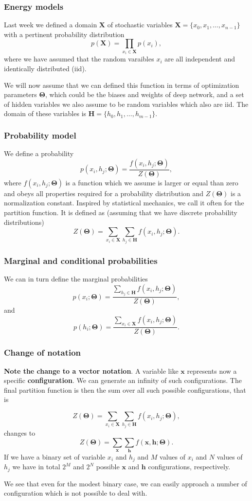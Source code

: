 \documentclass{beamer}
\begin{document}
\begin{frame}
\frametitle{Energy models}

Last week we defined a domain $\bm{X}$ of stochastic variables $\bm{X}= \{x_0,x_1, \dots , x_{n-1}\}$ with a pertinent probability distribution
\[
p(\bm{X})=\prod_{x_i\in \bm{X}}p(x_i),
\]
where we have assumed that the random varaibles $x_i$ are all independent and identically distributed (iid).

We will now assume that we can defined this function in terms of optimization parameters $\bm{\Theta}$, which could be the biases and weights of deep network, and a set of hidden variables we also assume to be random variables which also are iid. The domain of these variables is
$\bm{H}= \{h_0,h_1, \dots , h_{m-1}\}$.
\end{frame}

\begin{frame}
\frametitle{Probability model}

We define a probability
\[
p(x_i,h_j;\bm{\Theta}) = \frac{f(x_i,h_j;\bm{\Theta})}{Z(\bm{\Theta})},
\]
where $f(x_i,h_j;\bm{\Theta})$ is a function which we assume is larger or
equal than zero and obeys all properties required for a probability
distribution and $Z(\bm{\Theta})$ is a normalization constant. Inspired by
statistical mechanics, we call it often for the partition function.
It is defined as (assuming that we have discrete probability distributions)
\[
Z(\bm{\Theta})=\sum_{x_i\in \bm{X}}\sum_{h_j\in \bm{H}} f(x_i,h_j;\bm{\Theta}).
\]
\end{frame}

\begin{frame}
\frametitle{Marginal and conditional probabilities}

We can in turn define the marginal probabilities
\[
p(x_i;\bm{\Theta}) = \frac{\sum_{h_j\in \bm{H}}f(x_i,h_j;\bm{\Theta})}{Z(\bm{\Theta})},
\]
and 
\[
p(h_i;\bm{\Theta}) = \frac{\sum_{x_i\in \bm{X}}f(x_i,h_j;\bm{\Theta})}{Z(\bm{\Theta})}.
\]
\end{frame}

\begin{frame}
\frametitle{Change of notation}

\textbf{Note the change to a vector notation}. A variable like $\bm{x}$
represents now a specific \textbf{configuration}. We can generate an infinity
of such configurations. The final partition function is then the sum
over all such possible configurations, that is

\[
Z(\bm{\Theta})=\sum_{x_i\in \bm{X}}\sum_{h_j\in \bm{H}} f(x_i,h_j;\bm{\Theta}),
\]
changes to
\[
Z(\bm{\Theta})=\sum_{\bm{x}}\sum_{\bm{h}} f(\bm{x},\bm{h};\bm{\Theta}).
\]
If we have a binary set of variable $x_i$ and $h_j$ and $M$ values of $x_i$ and $N$ values of $h_j$ we have in total $2^M$ and $2^N$ possible $\bm{x}$ and $\bm{h}$ configurations, respectively.

We see that even for the modest binary case, we can easily approach a
number of configuration which is not possible to deal with.
\end{frame}
\end{document}
